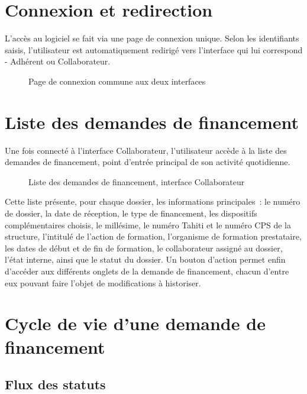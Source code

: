 \section{Connexion et redirection}

L'accès au logiciel se fait via une page de connexion unique. Selon les
identifiants saisis, l'utilisateur est automatiquement redirigé vers
l'interface qui lui correspond  -  Adhérent ou Collaborateur.

\begin{figure}[H]
  \centering
  \caption{Page de connexion commune aux deux interfaces}
  \label{fig:page-connexion}
\end{figure}

\section{Liste des demandes de financement}

Une fois connecté à l'interface Collaborateur, l'utilisateur accède à la
liste des demandes de financement, point d'entrée principal de son
activité quotidienne.

\begin{figure}[H]
  \centering
  \caption{Liste des demandes de financement, interface Collaborateur}
  \label{fig:liste-demandes}
\end{figure}

Cette liste présente, pour chaque dossier, les informations
principales~: le numéro de dossier, la date de réception, le type de
financement, les dispositifs complémentaires choisis, le millésime, le
numéro Tahiti et le numéro CPS de la structure, l'intitulé de l'action de
formation, l'organisme de formation prestataire, les dates de début et
de fin de formation, le collaborateur assigné au dossier, l'état interne,
ainsi que le statut du dossier. Un bouton d'action permet enfin d'accéder
aux différents onglets de la demande de financement, chacun d'entre eux
pouvant faire l'objet de modifications à historiser.

\section{Cycle de vie d'une demande de financement}

\subsection{Flux des statuts}

